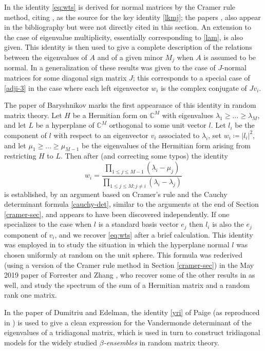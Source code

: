 \documentclass{amsart}
\newcommand\C{\mathbb{C}}
\begin{document}
In \cite[Section 2]{NTU} the identity \eqref{eq:wts} is derived for normal matrices by the Cramer rule method, citing \cite{thompson-iv}, \cite{deutsch} as the source for the key identity \eqref{lkmj}; the papers \cite{Thompson:1966}, \cite{Thompson:1968} also appear in the bibliography but were not directly cited in this section.  An extension to the case of eigenvalue multiplicity, essentially corresponding to \eqref{lam}, is also given.  This identity is then used to give a complete description of the relations between the eigenvalues of $A$ and of a given minor $M_j$ when $A$ is assumed to be normal.  In \cite{BFdP} a generalization of these results was given to the case of $J$-normal matrices for some diagonal sign matrix $J$; this corresponds to a special case of \eqref{adji-3} in the case where each left eigenvector $w_i$ is the complex conjugate of $Jv_i$.
 
The paper of Baryshnikov \cite{Bary} marks the first appearance of this identity in random matrix theory.  Let $H$ be a Hermitian form on $\C^M$ with eigenvalues $\lambda_1 \geq \dots \geq \lambda_M$, and let $L$ be a hyperplane of $\C^M$ orthogonal to some unit vector $l$.  Let $l_i$ be the component of $l$ with respect to an eigenvector $v_i$ associated to $\lambda_i$, set $w_i \coloneqq |l_i|^2$, and let $\mu_1 \geq \dots \geq \mu_{M-1}$ be the eigenvalues of the Hermitian form arising from restricting $H$ to $L$.  Then after \cite[(4.5.2)]{Bary} (and correcting some typos) the identity
$$ w_i = \frac{\prod_{1 \leq j \leq M-1}(\lambda_i-\mu_j)}{\prod_{1 \leq j \leq M; j \neq i} (\lambda_i-\lambda_j)}$$
is established, by an argument based on Cramer's rule and the Cauchy determinant formula \eqref{cauchy-det}, similar to the arguments at the end of Section \ref{cramer-sec}, and appears to have been discovered independently.  If one specializes to the case when $l$ is a standard basis vector $e_j$ then $l_i$ is also the $e_j$ component of $v_i$, and we recover \eqref{eq:wts} after a brief calculation.  This identity was employed in \cite{Bary} to study the situation in which the hyperplane normal $l$ was chosen uniformly at random on the unit sphere.  This formula was rederived (using a version of the Cramer rule method in Section \ref{cramer-sec}) in the May 2019 paper of Forrester and Zhang \cite[(2.7)]{2019arXiv190505314F}, who recover some of the other results in \cite{Bary} as well, and study the spectrum of the sum of a Hermitian matrix and a random rank one matrix.

In the paper \cite[Lemma 2.7]{DE} of Dumitriu and Edelman, the identity \eqref{yri} of Paige (as reproduced in \cite[Theorem 7.9.2]{Parlett}) is used to give a clean expression for the Vandermonde determinant of the eigenvalues of a tridiagonal matrix, which is used in turn to construct tridiagonal models for the widely studied \emph{$\beta$-ensembles} in random matrix theory.
\end{document}
